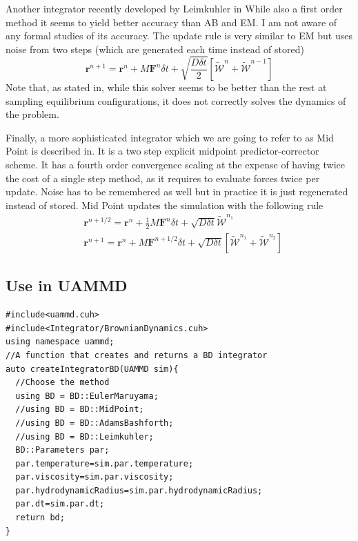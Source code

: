 \documentclass[ twoside,openright,titlepage,numbers=noenddot,%
headinclude,footinclude,cleardoublepage=empty,abstract=on,
BCOR=5mm,paper=a4,fontsize=11pt, dvipsnames
]{scrreprt}
\renewcommand{\vec}[1]{\bm{#1}}
\newcommand{\dt}{\delta t}
\newcommand{\half}{\frac{1}{2}}
\newcommand{\noise}{\widetilde{W}}
\begin{document}
Another integrator recently developed by Leimkuhler in\cite{Leimkuhler2015}
 While also a first order method it seems to yield better accuracy than \gls{AB} and \gls{EM}. I am not aware of any formal studies of its accuracy.
 The update rule is very similar to \gls{EM} but uses noise from two steps (which are generated each time instead of stored)
 \begin{equation}
  \vec{r}^{n+1} = \vec{r}^n + M\vec{F}^n\dt + \sqrt{\frac{D\dt}{2}}\left[\vec{\mathcal{\noise}}^n + \vec{\mathcal{\noise}}^{n-1}\right]
\end{equation}
Note that, as stated in\cite{Leimkuhler2015}, while this solver seems to be better than the rest at sampling equilibrium configurations, it does not correctly solves the dynamics of the problem.

Finally, a more sophisticated integrator which we are going to refer to as Mid Point is described in\cite{Delong2013}. 
It is a two step explicit midpoint predictor-corrector scheme. It has a fourth order convergence scaling at the expense of having twice the cost of a single step method, as it requires to evaluate forces twice per update. Noise has to be remembered as well but in practice it is just regenerated instead of stored.
Mid Point updates the simulation with the following rule
\begin{equation}
  \begin{aligned}
    &\vec{r}^{n+1/2} = \vec{r}^n + \half M\vec{F}^n\dt + \sqrt{D\dt}\vec{\mathcal{\noise}}^{n_1}\\
    &\vec{r}^{n+1} = \vec{r}^n + M\vec{F}^{n+1/2}\dt + \sqrt{D\dt}\left[\vec{\mathcal{\noise}}^{n_1}  + \vec{\mathcal{\noise}}^{n_2}\right]
  \end{aligned}
\end{equation}
\subsection{Use in UAMMD}

\begin{verbatim}
#include<uammd.cuh>
#include<Integrator/BrownianDynamics.cuh>
using namespace uammd;
//A function that creates and returns a BD integrator
auto createIntegratorBD(UAMMD sim){   
  //Choose the method
  using BD = BD::EulerMaruyama;
  //using BD = BD::MidPoint;
  //using BD = BD::AdamsBashforth;
  //using BD = BD::Leimkuhler;
  BD::Parameters par;
  par.temperature=sim.par.temperature;
  par.viscosity=sim.par.viscosity;
  par.hydrodynamicRadius=sim.par.hydrodynamicRadius;
  par.dt=sim.par.dt;
  return bd;
}
\end{verbatim}
\end{document}
